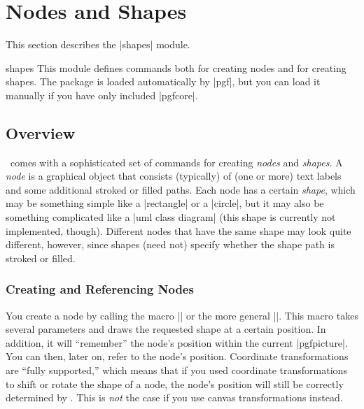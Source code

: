 %
%
%


\section{Nodes and Shapes}

\label{section-shapes}

This section describes the |shapes| module.

\begin{pgfmodule}{shapes}
  This module defines commands both for creating nodes and for
  creating shapes. The package is loaded automatically by |pgf|, but
  you can load it manually if you have  only included |pgfcore|.
\end{pgfmodule}


\subsection{Overview}

\pgfname\ comes with a sophisticated set of commands for creating
\emph{nodes} and \emph{shapes}. A \emph{node} is a graphical object
that consists (typically) of (one or more) text labels and some
additional stroked or filled paths. Each node has a certain
\emph{shape}, which may be something simple like a |rectangle| or a
|circle|, but it may also be something complicated like a
|uml class diagram| (this shape is currently not implemented,
though). Different nodes that have the same shape may look quite
different, however, since shapes (need not) specify whether the shape
path is stroked or filled.


\subsubsection{Creating and Referencing Nodes}

You create a node by calling the macro |\pgfnode| or the more general
|\pgfmultipartnode|. This macro takes several parameters and draws
the requested shape at a certain position. In addition, it will
``remember'' the node's position within the current
|{pgfpicture}|. You can then, later on, refer to the
node's position. Coordinate transformations are ``fully supported,''
which means that if you used coordinate transformations to shift or
rotate the shape of a node, the node's position will still be correctly
determined by \pgfname. This is \emph{not} the case if you use canvas
transformations instead.



